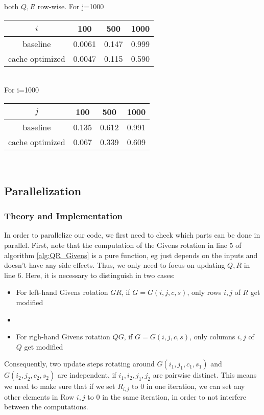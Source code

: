 \documentclass[a4paper]{scrartcl}
\begin{document}
        both $Q,R$ row-wise.
        For j=1000
        \noindent\begin{tabular}{c|c|c|c}
            $i$ & 100 & 500 & 1000 \\
            \hline
            baseline & 0.0061 & 0.147 & 0.999\\
            cache optimized & 0.0047 & 0.115 & 0.590\\
        \end{tabular}\\[10pt]

        For i=1000
        \noindent\begin{tabular}{c|c|c|c}
            $j$ & 100 & 500 & 1000 \\
            \hline
            baseline & 0.135 & 0.612 & 0.991\\
            cache optimized & 0.067 & 0.339 & 0.609\\
        \end{tabular}\\[10pt]


    \subsection{Parallelization}
        \subsubsection{Theory and Implementation}
            In order to parallelize our code, we first need to check which
            parts can be done in parallel. First, note that the computation
            of the Givens rotation in line 5 of algorithm
            \ref{alg:QR_Givens} is a pure function, eg just depends on the
            inputs and doesn't have any side effects. Thus, we only need to
            focus on updating $Q,R$ in line 6. Here, it is necessary to
            distinguish in two cases:
            \begin{itemize}
                \item For left-hand Givens rotation $GR$, if $G=G(i,j,c,s)$,
                only rows $i,j$ of $R$ get modified
                \item \item For righ-hand Givens rotation $QG$, if
                $G=G(i,j,c,s)$, only columns $i,j$ of $Q$ get modified
            \end{itemize}
            Consequently, two update steps rotating around
            $G(i_1,j_1,c_1,s_1)$ and $G(i_2,j_2,c_2,s_2)$ are independent,
            if $i_1, i_2, j_1, j_2$ are pairwise distinct. This means we
            need to make sure that if we set $R_{i,j}$ to 0 in one
            iteration, we can set any other elements in Row $i,j$ to 0 in
            the same iteration, in order to not interfere between the
            computations.
            
\end{document}
